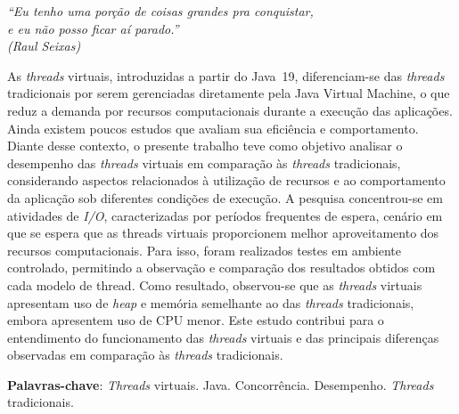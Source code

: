 \documentclass[12pt, openright, oneside, a4paper, english,	french,	spanish, brazil	]{abntex2}
\begin{document}

\begin{epigrafe}
    \vspace*{\fill}
    \begin{flushright}
        \textit{
            ``Eu tenho uma porção de coisas grandes pra conquistar,\\
            e eu não posso ficar aí parado.''\\
            (Raul Seixas)
        }
    \end{flushright}
\end{epigrafe}


    \begin{resumo}
            As  \textit{threads} virtuais, introduzidas a partir do Java~19, diferenciam-se das \textit{threads} tradicionais por serem gerenciadas diretamente pela Java Virtual Machine, o que reduz a demanda por recursos computacionais durante a execução das aplicações. Ainda existem poucos estudos que avaliam sua eficiência e comportamento. Diante desse contexto, o presente trabalho teve como objetivo analisar o desempenho das \textit{threads} virtuais em comparação às \textit{threads} tradicionais, considerando aspectos relacionados à utilização de recursos e ao comportamento da aplicação sob diferentes condições de execução. A pesquisa concentrou-se em atividades de \textit{I/O}, caracterizadas por períodos frequentes de espera, cenário em que se espera que as threads virtuais proporcionem melhor aproveitamento dos recursos computacionais. Para isso, foram realizados testes em ambiente controlado, permitindo a observação e comparação dos resultados obtidos com cada modelo de thread. Como resultado, observou-se que as \textit{threads} virtuais apresentam uso de \textit{heap} e memória semelhante ao das \textit{threads} tradicionais, embora apresentem uso de CPU menor. Este estudo contribui para o entendimento do funcionamento das \textit{threads} virtuais e das principais diferenças observadas em comparação às \textit{threads} tradicionais.

        \noindent \textbf{Palavras-chave}: \textit{Threads} virtuais. Java. Concorrência. Desempenho. \textit{Threads} tradicionais.
    \end{resumo}
\end{document}
